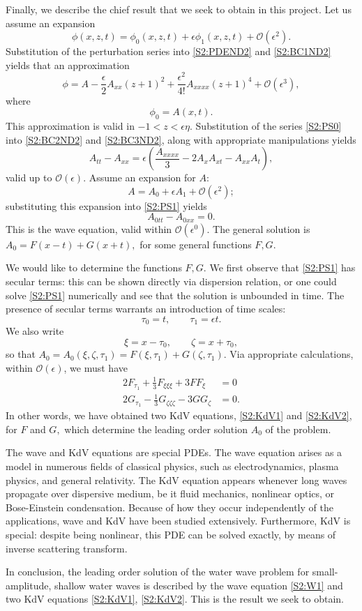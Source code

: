 Finally, we describe the chief result that we seek to obtain in this project. Let us assume an expansion
\[ \phi(x,z,t) = \phi_0(x,z,t) + \epsilon \phi_1(x,z,t) + \mathcal{O}(\epsilon^2).\]
Substitution of the perturbation series into \eqref{S2:PDEND2} and \eqref{S2:BC1ND2} yields that an approximation
\begin{equation}\label{S2:PS0}
\phi = A - \frac{\epsilon}{2} A_{xx}(z+1)^2 + \frac{\epsilon^2}{4!} A_{xxxx} (z+1)^4 + \mathcal{O}(\epsilon^3),
\end{equation}
where
\[ \phi_0 = A(x,t).\]
This approximation is valid in $-1<z<\epsilon \eta.$ Substitution of the series \eqref{S2:PS0} into \eqref{S2:BC2ND2} and \eqref{S2:BC3ND2}, along with appropriate manipulations yields
\begin{equation}\label{S2:PS1}
A_{tt} - A_{xx} = \epsilon\left( \frac{A_{xxxx}}{3} - 2A_x A_{xt} - A_{xx}A_t\right),
\end{equation}
valid up to $\mathcal{O}(\epsilon).$ Assume an expansion for $A:$ 
\[ A = A_0 + \epsilon A_1 + \mathcal{O}(\epsilon^2);\]
substituting this expansion into \eqref{S2:PS1} yields
\begin{equation}\label{S2:W1}
 A_{0tt} - A_{0xx} = 0.
\end{equation}
This is the wave equation, valid within $\mathcal{O}(\epsilon^0).$ The general solution is $A_0 = F(x-t) + G(x+t),$ for some general functions $F,G.$

We would like to determine the functions $F,G.$ We first observe that \eqref{S2:PS1} has secular terms: this can be shown directly via dispersion relation, or one could solve \eqref{S2:PS1} numerically and see that the solution is unbounded in time. The presence of secular terms warrants an introduction of time scales:
\[ \tau_0 = t, \qquad \tau_1 = \epsilon t.\]
We also write 
\[ 
\xi = x- \tau_0, \qquad \zeta = x + \tau_0,
\]
so that $A_0 = A_0(\xi, \zeta, \tau_1) = F(\xi, \tau_1) + G(\zeta, \tau_1).$ Via appropriate calculations, within $\mathcal{O}(\epsilon)$, we must have 
\begin{align}
2F_{\tau_1} + \frac{1}{3}F_{\xi\xi\xi} + 3 F F_\xi &= 0 \label{S2:KdV1} \\
2G_{\tau_1} - \frac{1}{3}G_{\zeta\zeta\zeta} -  3 G G_\zeta &= 0. \label{S2:KdV2}
\end{align}
In other words, we have obtained two KdV equations, \eqref{S2:KdV1} and \eqref{S2:KdV2}, for $F$ and $G,$ which determine the leading order solution $A_0$ of the problem. 

The wave and KdV equations are special PDEs. The wave equation arises as a model in numerous fields of classical physics, such as electrodynamics, plasma physics, and general relativity. The KdV equation appears whenever long waves propagate over dispersive medium, be it fluid mechanics, nonlinear optics, or Bose-Einstein condensation. Because of how they occur independently of the applications, wave and KdV have been studied extensively. Furthermore, KdV is special: despite being nonlinear, this PDE can be solved exactly, by means of inverse scattering transform. 

In conclusion, the leading order solution of the water wave problem for small-amplitude, shallow water waves is described by the wave equation \eqref{S2:W1} and two KdV equations \eqref{S2:KdV1}, \eqref{S2:KdV2}. This is the result we seek to obtain. 